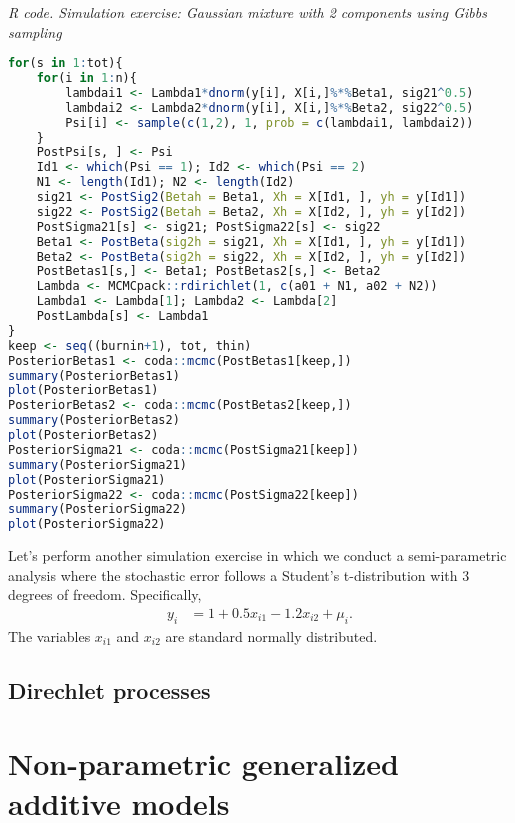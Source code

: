 \begin{tcolorbox}[enhanced,width=4.67in,center upper,
	fontupper=\large\bfseries,drop shadow southwest,sharp corners]
	\textit{R code. Simulation exercise: Gaussian mixture with 2 components using Gibbs sampling}
	\begin{VF}
		\begin{lstlisting}[language=R]
for(s in 1:tot){
	for(i in 1:n){
		lambdai1 <- Lambda1*dnorm(y[i], X[i,]%*%Beta1, sig21^0.5)
		lambdai2 <- Lambda2*dnorm(y[i], X[i,]%*%Beta2, sig22^0.5)
		Psi[i] <- sample(c(1,2), 1, prob = c(lambdai1, lambdai2))
	}
	PostPsi[s, ] <- Psi
	Id1 <- which(Psi == 1); Id2 <- which(Psi == 2)
	N1 <- length(Id1); N2 <- length(Id2)
	sig21 <- PostSig2(Betah = Beta1, Xh = X[Id1, ], yh = y[Id1])
	sig22 <- PostSig2(Betah = Beta2, Xh = X[Id2, ], yh = y[Id2])
	PostSigma21[s] <- sig21; PostSigma22[s] <- sig22
	Beta1 <- PostBeta(sig2h = sig21, Xh = X[Id1, ], yh = y[Id1])
	Beta2 <- PostBeta(sig2h = sig22, Xh = X[Id2, ], yh = y[Id2])
	PostBetas1[s,] <- Beta1; PostBetas2[s,] <- Beta2
	Lambda <- MCMCpack::rdirichlet(1, c(a01 + N1, a02 + N2))
	Lambda1 <- Lambda[1]; Lambda2 <- Lambda[2]
	PostLambda[s] <- Lambda1 
}
keep <- seq((burnin+1), tot, thin)
PosteriorBetas1 <- coda::mcmc(PostBetas1[keep,])
summary(PosteriorBetas1)
plot(PosteriorBetas1)
PosteriorBetas2 <- coda::mcmc(PostBetas2[keep,])
summary(PosteriorBetas2)
plot(PosteriorBetas2)
PosteriorSigma21 <- coda::mcmc(PostSigma21[keep])
summary(PosteriorSigma21)
plot(PosteriorSigma21)
PosteriorSigma22 <- coda::mcmc(PostSigma22[keep])
summary(PosteriorSigma22)
plot(PosteriorSigma22)
\end{lstlisting}
	\end{VF}
\end{tcolorbox}

Let's perform another simulation exercise in which we conduct a semi-parametric analysis where the stochastic error follows a Student's t-distribution with 3 degrees of freedom. Specifically,  
\begin{align*}
	y_i &= 1 + 0.5x_{i1} - 1.2x_{i2} + \mu_i.
\end{align*}
The variables $x_{i1}$ and $x_{i2}$ are standard normally distributed.



\subsection{Direchlet processes}\label{sec11_12}

\section{Non-parametric generalized additive models}\label{sec11_2}

